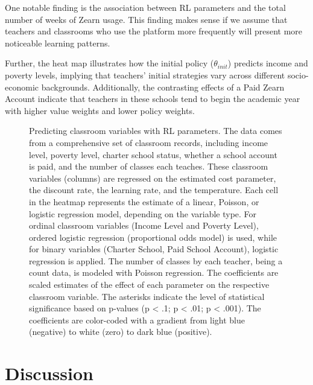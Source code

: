 \documentclass[
  number,
  preprint,
  3p,
  onecolumn]{elsarticle}
\begin{document}
One notable finding is the association between RL parameters and the
total number of weeks of Zearn usage. This finding makes sense if we
assume that teachers and classrooms who use the platform more frequently
will present more noticeable learning patterns.

Further, the heat map illustrates how the initial policy
(\(\theta_{init}\)) predicts income and poverty levels, implying that
teachers' initial strategies vary across different socio-economic
backgrounds. Additionally, the contrasting effects of a Paid Zearn
Account indicate that teachers in these schools tend to begin the
academic year with higher value weights and lower policy weights.

\begin{figure}


\caption{\label{fig-heterogeneity}Predicting classroom variables with RL
parameters. The data comes from a comprehensive set of classroom
records, including income level, poverty level, charter school status,
whether a school account is paid, and the number of classes each
teaches. These classroom variables (columns) are regressed on the
estimated cost parameter, the discount rate, the learning rate, and the
temperature. Each cell in the heatmap represents the estimate of a
linear, Poisson, or logistic regression model, depending on the variable
type. For ordinal classroom variables (Income Level and Poverty Level),
ordered logistic regression (proportional odds model) is used, while for
binary variables (Charter School, Paid School Account), logistic
regression is applied. The number of classes by each teacher, being a
count data, is modeled with Poisson regression. The coefficients are
scaled estimates of the effect of each parameter on the respective
classroom variable. The asterisks indicate the level of statistical
significance based on p-values (p \textless{} .1; p \textless{} .01; p
\textless{} .001). The coefficients are color-coded with a gradient from
light blue (negative) to white (zero) to dark blue (positive).}

\end{figure}%

\section{Discussion}\label{discussion}
\end{document}
